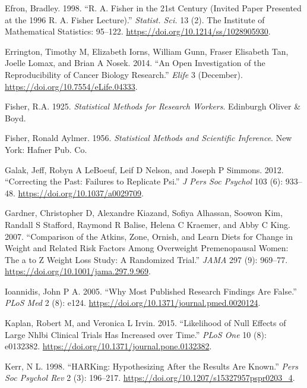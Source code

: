 \documentclass[12pt,]{book}
\theoremstyle{definition}
\theoremstyle{definition}
\theoremstyle{definition}
\theoremstyle{remark}
\begin{document}
\leavevmode\hypertarget{ref-efron1998}{}%
Efron, Bradley. 1998. ``R. A. Fisher in the 21st Century (Invited Paper Presented at the 1996 R. A. Fisher Lecture).'' \emph{Statist. Sci.} 13 (2). The Institute of Mathematical Statistics: 95--122. \url{https://doi.org/10.1214/ss/1028905930}.

\leavevmode\hypertarget{ref-erri:iorn:gunn:2014}{}%
Errington, Timothy M, Elizabeth Iorns, William Gunn, Fraser Elisabeth Tan, Joelle Lomax, and Brian A Nosek. 2014. ``An Open Investigation of the Reproducibility of Cancer Biology Research.'' \emph{Elife} 3 (December). \url{https://doi.org/10.7554/eLife.04333}.

\leavevmode\hypertarget{ref-fisher1925statistical}{}%
Fisher, R.A. 1925. \emph{Statistical Methods for Research Workers}. Edinburgh Oliver \& Boyd.

\leavevmode\hypertarget{ref-fish:1956}{}%
Fisher, Ronald Aylmer. 1956. \emph{Statistical Methods and Scientific Inference}. New York: Hafner Pub. Co.

\leavevmode\hypertarget{ref-gala:lebo:nels:2012}{}%
Galak, Jeff, Robyn A LeBoeuf, Leif D Nelson, and Joseph P Simmons. 2012. ``Correcting the Past: Failures to Replicate Psi.'' \emph{J Pers Soc Psychol} 103 (6): 933--48. \url{https://doi.org/10.1037/a0029709}.

\leavevmode\hypertarget{ref-gard:kiaz:alha:2007}{}%
Gardner, Christopher D, Alexandre Kiazand, Sofiya Alhassan, Soowon Kim, Randall S Stafford, Raymond R Balise, Helena C Kraemer, and Abby C King. 2007. ``Comparison of the Atkins, Zone, Ornish, and Learn Diets for Change in Weight and Related Risk Factors Among Overweight Premenopausal Women: The a to Z Weight Loss Study: A Randomized Trial.'' \emph{JAMA} 297 (9): 969--77. \url{https://doi.org/10.1001/jama.297.9.969}.

\leavevmode\hypertarget{ref-ioan:2005}{}%
Ioannidis, John P A. 2005. ``Why Most Published Research Findings Are False.'' \emph{PLoS Med} 2 (8): e124. \url{https://doi.org/10.1371/journal.pmed.0020124}.

\leavevmode\hypertarget{ref-kapl:irvi:2015}{}%
Kaplan, Robert M, and Veronica L Irvin. 2015. ``Likelihood of Null Effects of Large Nhlbi Clinical Trials Has Increased over Time.'' \emph{PLoS One} 10 (8): e0132382. \url{https://doi.org/10.1371/journal.pone.0132382}.

\leavevmode\hypertarget{ref-kerr:1998}{}%
Kerr, N L. 1998. ``HARKing: Hypothesizing After the Results Are Known.'' \emph{Pers Soc Psychol Rev} 2 (3): 196--217. \url{https://doi.org/10.1207/s15327957pspr0203_4}.
\end{document}
